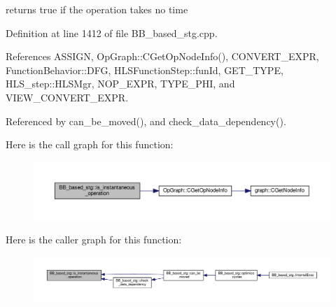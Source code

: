 returns true if the operation takes no time 



Definition at line 1412 of file B\+B\+\_\+based\+\_\+stg.\+cpp.



References A\+S\+S\+I\+GN, Op\+Graph\+::\+C\+Get\+Op\+Node\+Info(), C\+O\+N\+V\+E\+R\+T\+\_\+\+E\+X\+PR, Function\+Behavior\+::\+D\+FG, H\+L\+S\+Function\+Step\+::fun\+Id, G\+E\+T\+\_\+\+T\+Y\+PE, H\+L\+S\+\_\+step\+::\+H\+L\+S\+Mgr, N\+O\+P\+\_\+\+E\+X\+PR, T\+Y\+P\+E\+\_\+\+P\+HI, and V\+I\+E\+W\+\_\+\+C\+O\+N\+V\+E\+R\+T\+\_\+\+E\+X\+PR.



Referenced by can\+\_\+be\+\_\+moved(), and check\+\_\+data\+\_\+dependency().

Here is the call graph for this function\+:
\nopagebreak
\begin{figure}[H]
\begin{center}
\leavevmode
\includegraphics[width=350pt]{dd/d84/classBB__based__stg_af428643fbc02e8269040fc2ecdb73986_cgraph}
\end{center}
\end{figure}
Here is the caller graph for this function\+:
\nopagebreak
\begin{figure}[H]
\begin{center}
\leavevmode
\includegraphics[width=350pt]{dd/d84/classBB__based__stg_af428643fbc02e8269040fc2ecdb73986_icgraph}
\end{center}
\end{figure}
\mbox{\label{classBB__based__stg_a9cb34c2e58d4fee4571e3b90181d3049}} 
